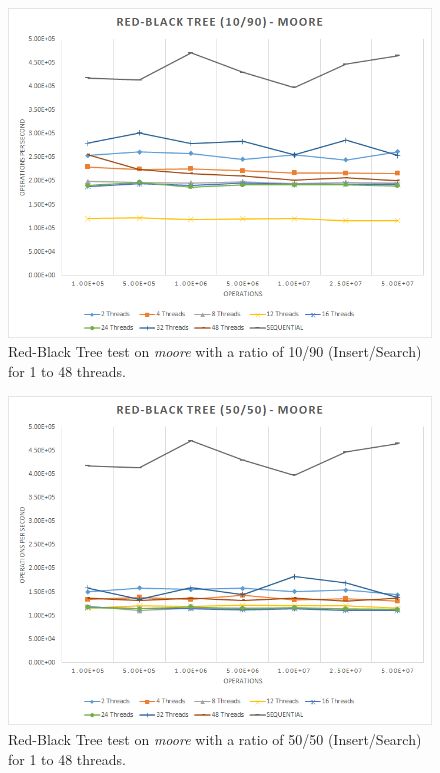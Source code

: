 \documentclass[oneside,a4paper]{scrartcl}
\begin{document}
\begin{figure}
	\centering
	\includegraphics[width=1.0\textwidth]{results1090.png}
	\caption{Red-Black Tree test on \emph{moore} with a ratio of 10/90 (Insert/Search) for 1 to 48 threads.}
	\label{plot_1090}
\end{figure}

\begin{figure}
	\centering
	\includegraphics[width=1.0\textwidth]{results5050.png}
	\caption{Red-Black Tree test on \emph{moore} with a ratio of 50/50 (Insert/Search) for 1 to 48 threads.}
	\label{plot_5050}
\end{figure}
\end{document}

